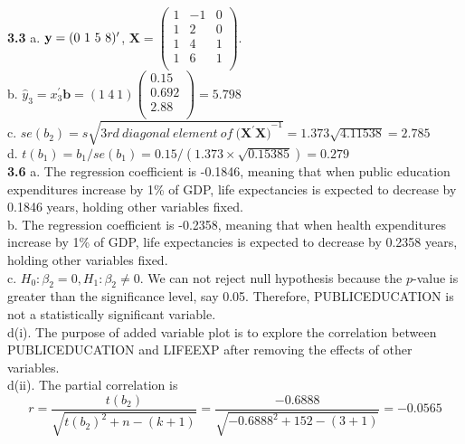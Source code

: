 \textbf{3.3} a. ${\bf y}=(0~1~5~8)^{\prime}$, $\mathbf{X}=\left(
                                       \begin{array}{ccc}
                                         1 & -1 & 0 \\
                                         1 & 2  & 0 \\
                                         1 & 4  & 1 \\
                                         1 & 6  & 1 \\
                                       \end{array}
                                     \right)$.\\
b. $\hat{y}_{3}=x^{\prime}_{3}\mathbf{b}=(1~4~1)\left(
                                                      \begin{array}{c}
                                                        0.15 \\
                                                        0.692 \\
                                                        2.88 \\
                                                      \end{array}
                                                    \right)=5.798$
                                                    \\
c. $se(b_{2})=s\sqrt{3rd~diagonal~element~of~(\mathbf{X^{\prime
}X)}^{-1}}=1.373\sqrt{4.11538}=2.785$\\
d. $t(b_1)=b_1/se(b_1)=0.15/(1.373\times\sqrt{0.15385})=0.279$\\

\textbf{3.6} a. The regression coefficient is -0.1846, meaning that
when public education expenditures increase by 1\% of GDP, life
expectancies is expected to decrease by 0.1846 years, holding other
variables fixed.\\
b. The regression coefficient is -0.2358, meaning that when health
expenditures increase by 1\% of GDP, life expectancies is expected
to decrease by 0.2358 years, holding other
variables fixed.\\
c. $H_{0}:\beta_2=0, H_{1}:\beta_2\neq0$. We can not reject null
hypothesis because the $p$-value is greater than the significance
level, say 0.05. Therefore, PUBLICEDUCATION
is not a statistically significant variable.\\
d(i). The purpose of added variable plot is to explore the
correlation between PUBLICEDUCATION and LIFEEXP
after removing the effects of other variables.\\
d(ii). The partial correlation is
$$r=\frac{t(b_2)}{\sqrt{t(b_2)^2+n-(k+1)}}=\frac{-0.6888}{\sqrt{-0.6888^2+152-(3+1)}}=-0.0565$$

